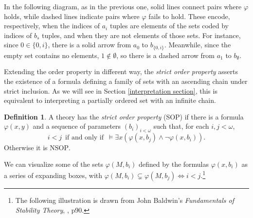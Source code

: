 \documentclass{article}
\newcommand{\IFF}{\enspace\text{if and only if}\enspace}
\newcommand{\vphi}{\varphi}
\theoremstyle{definition}
\newtheorem{definition}{Definition}
\theoremstyle{definition}
\theoremstyle{definition}
\begin{document}


In the following diagram, as in the previous one, solid lines connect pairs where $\vphi$ holds, while dashed lines indicate pairs where $\vphi$ fails to hold. These encode, respectively, when the indices of $a_i$ tuples are elements of the sets coded by indices of $b_s$ tuples, and when they are not elements of those sets. For instance, since $0\in\{0,i\}$, there is a solid arrow from $a_0$ to $b_{\{0,i\}}$. Meanwhile, since the empty set contains no elements, $1\notin \emptyset$, so there is a dashed arrow from $a_1$ to $b_\emptyset$.



\begin{center}
\end{center}




Extending the order property in different way, the \textit{strict order property} asserts the existence of a formula defining a family of sets with an ascending chain under strict inclusion. As we will see in Section \ref{interpretation section}, this is equivalent to interpreting a partially ordered set with an infinite chain.


\begin{definition}
    A theory has the \textit{strict order property} (SOP) if there is a formula $\vphi(x,y)$ and a sequence of parameters $(b_i)_{i<\omega}$ such that, for each $i,j<\omega$, \[i<j \IFF \models \exists x(\vphi(x,b_{j})\land\neg\vphi(x,b_i)).\] Otherwise it is $\mathrm{NSOP}$.


    We can visualize some of the sets $\varphi(M, b_{i})$ defined by the formulas $\varphi(x, b_{i})$ as a series of expanding boxes, with $\varphi(M,b_i) \subsetneq \varphi(M,b_j) \iff i < j$.\footnote{The following illustration is drawn from John Baldwin's \textit{Fundamentals of Stability Theory}, \cite{baldwin1988fundamentals}, p90.}
\end{definition}
\end{document}
